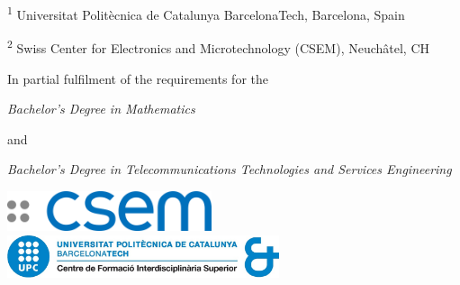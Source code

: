 \begin{center}
    \vspace{1cm}
    \footnotesize
    \textsuperscript{1} Universitat Polit\`ecnica de Catalunya BarcelonaTech, Barcelona, Spain

    \textsuperscript{2} Swiss Center for Electronics and Microtechnology (CSEM), Neuch\^atel, CH

    \vspace{1cm}
    \normalsize
    In partial fulfilment of the requirements for the

    \textit{Bachelor's Degree in Mathematics}

    and

    \textit{Bachelor's Degree in Telecommunications Technologies and Services Engineering}

    \vfill
    \includegraphics[width=6cm]{img/logo-csem.png} 
    \hfill
    \includegraphics[width=8cm]{img/cfis-upc-no-bg.png}

\end{center}
